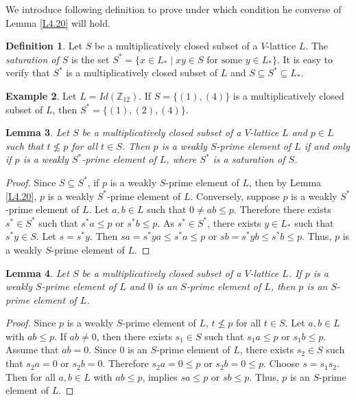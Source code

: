 \documentclass[10pt,twoside,a4paper]{amsart}
\numberwithin{equation}{section}
\theoremstyle{plain}
\newtheorem{lem}{Lemma}[section]
\theoremstyle{definition}
\newtheorem{exa}[lem]{Example}
\newtheorem{definition}[lem]{Definition}
\begin{document}
We introduce following definition to prove under which condition he converse of  Lemma \ref{L4.20} will hold. 


\begin{definition}
	Let $S$ be a multiplicatively closed subset of a $V$-lattice $L$. The \textit{saturation of $S$} is the set $S^*=\{x\in L_* \;|\; xy\in S \textrm{ for some }y \in L_*\}$. It is easy to verify that $S^*$ is a multiplicatively closed subset of $L$ and $S\subseteq S^* \subseteq L_*$.
\end{definition}

\begin{exa}
	Let $L=Id(\mathbb{Z}_{12})$. If $S =\{(1),(4)\}$ is a multiplicatively closed subset of $L$, then $S^* = \{(1), (2), (4) \}$.  
\end{exa}


\begin{lem}%
	Let $S$ be a multiplicatively closed subset of a $V$-lattice $L$ and $p\in L$ such that $t\nleq p$ for all $t\in S$. Then $p$ is a weakly $S$-prime element of $L$ if and only if $p$ is a weakly $S^*$-prime element of $L$, where $S^*$ is a saturation of $S$.
\end{lem}	
\begin{proof}
	Since $S\subseteq S^*$, if $p$ is a weakly $S$-prime element of $L$, then by Lemma \ref{L4.20}, $p$ is a weakly $S^*$-prime element of $L$.
	Conversely, suppose $p$ is a weakly $S^*$-prime element of $L$.  Let $a,b\in L$ such that $0 \neq ab \leq p$. Therefore there exists $s^*\in S^*$ such that $s^*a\leq p$ or $s^*b\leq p$. As $s^*\in S^*$, there exists $y\in L_*$ such that $s^*y\in S$. Let $s=s^*y$. Then $sa=s^*ya\leq s^*a\leq p$ or $sb=s^*yb\leq s^*b\leq p$. Thus, $p$ is a weakly $S$-prime element of $L$.
\end{proof}


\begin{lem}%
	Let $S$ be a multiplicatively closed subset of a $V$-lattice $L$. If $p$ is a  weakly $S$-prime element of $L$ and $0$ is an $S$-prime element of $L$, then $p$ is an $S$-prime element of $L$.
\end{lem}
\begin{proof}
	Since $p$ is a  weakly $S$-prime element of $L$, $t\nleq p$ for all $t\in S$. Let $a,b\in L$ with $ab\leq p$.  If $ab\neq 0$, then there exists $s_1\in S$ such that $s_1a\leq p$ or $s_1b\leq p$. Assume that $ab= 0$. Since $0$ is an $S$-prime element of $L$, there exists $s_2\in S$ such that $s_2a= 0$ or $s_2b= 0$. Therefore $s_2a= 0\leq p$ or $s_2b= 0 \leq p$. Choose $s=s_1s_2$. Then for all $a,b \in L$ with $ab\leq p$, implies  $sa\leq p$ or $sb \leq p$. Thus, $p$ is an $S$-prime element of $L$.
\end{proof}
\end{document}
